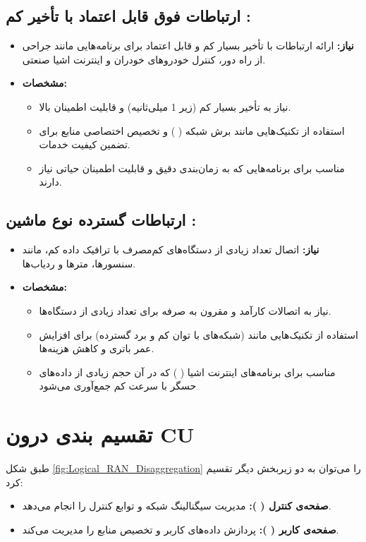 \documentclass[landscape, 12pt]{report}
\begin{document}
 	\section*{
 	ارتباطات فوق قابل اعتماد با تأخیر کم 
 	:}
 	\begin{itemize}
 		\item \textbf{نیاز:}
 		ارائه ارتباطات با تأخیر بسیار کم و قابل اعتماد برای برنامه‌هایی مانند جراحی از راه دور، کنترل خودروهای خودران و اینترنت اشیا صنعتی.
 		\item \textbf{مشخصات:}
 		\begin{itemize}
 			\item 
نیاز به تأخیر بسیار کم (زیر 1 میلی‌ثانیه) و قابلیت اطمینان بالا.
 			\item 
 استفاده از تکنیک‌هایی مانند برش شبکه (
 ) و تخصیص اختصاصی منابع برای تضمین کیفیت خدمات.
 			\item 
 	مناسب برای برنامه‌هایی که به زمان‌بندی دقیق و قابلیت اطمینان حیاتی نیاز دارند.
 		\end{itemize}
 	\end{itemize}
 	
 	\section*{
 		ارتباطات گسترده نوع ماشین
 		 :}
 	\begin{itemize}
 		\item \textbf{نیاز:}
 		اتصال تعداد زیادی از دستگاه‌های کم‌مصرف با ترافیک داده کم، مانند سنسورها، مترها و ردیاب‌ها.
 		\item \textbf{مشخصات:}
 		\begin{itemize}
 			\item 
 	نیاز به اتصالات کارآمد و مقرون به صرفه برای تعداد زیادی از دستگاه‌ها.
 			\item 
 	استفاده از تکنیک‌هایی مانند
 	  (شبکه‌های با توان کم و برد گسترده) برای افزایش عمر باتری و کاهش هزینه‌ها.
 			\item 
 			مناسب برای برنامه‌های اینترنت اشیا (
 			) که در آن حجم زیادی از داده‌های حسگر با سرعت کم جمع‌آوری می‌شود
 		\end{itemize}
 	\end{itemize}
 	
 	
\chapter*{تقسیم بندی درون CU}
طبق شکل \ref{fig:Logical_RAN_Disaggregation}
 را می‌توان به دو زیربخش دیگر تقسیم کرد:
\begin{itemize}
	\item 
	\textbf{صفحه‌ی کنترل (
	):}
	 مدیریت سیگنالینگ شبکه و توابع کنترل را انجام می‌دهد.
	\item 
	\textbf{صفحه‌ی کاربر (
	): }
	پردازش داده‌های کاربر و تخصیص منابع را مدیریت می‌کند.
\end{itemize}
\end{document}
